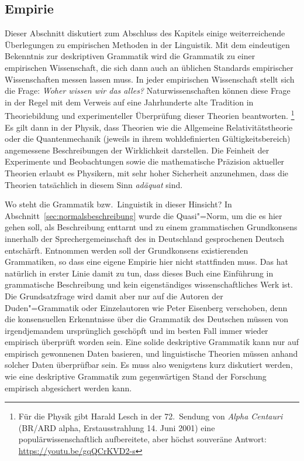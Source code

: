 \subsection{Empirie}

\label{sec:empirie}


Dieser Abschnitt diskutiert zum Abschluss des Kapitels einige weiterreichende Überlegungen zu empirischen Methoden in der Linguistik.
Mit dem eindeutigen Bekenntnis zur deskriptiven Grammatik wird die Grammatik zu einer empirischen Wissenschaft, die sich dann auch an üblichen Standards empirischer Wissenschaften messen lassen muss.     
In jeder empirischen Wissenschaft stellt sich die Frage:
\textit{Woher wissen wir das alles?}
Naturwissenschaften können diese Frage in der Regel mit dem Verweis auf eine Jahrhunderte alte Tradition in Theoriebildung und experimenteller Überprüfung dieser Theorien beantworten.%
\footnote{Für die Physik gibt Harald Lesch in der 72.\ Sendung von \textit{Alpha Centauri} (BR\slash ARD alpha, Erstausstrahlung 14. Juni 2001) eine populärwissenschaftlich aufbereitete, aber höchst souveräne Antwort: \url{https://youtu.be/gqQCrKVD2-s}}
Es gilt dann \zB in der Physik, dass Theorien wie die Allgemeine Relativitätstheorie oder die Quantenmechanik (jeweils in ihrem wohldefinierten Gültigkeitsbereich) angemessene Beschreibungen der Wirklichkeit darstellen.
Die Feinheit der Experimente und Beobachtungen sowie die mathematische Präzision aktueller Theorien erlaubt es Physikern, mit sehr hoher Sicherheit anzunehmen, dass die Theorien tatsächlich in diesem Sinn \textit{adäquat} sind.

Wo steht die Grammatik bzw.\ Linguistik in dieser Hinsicht?
In Abschnitt~\ref{sec:normalsbeschreibung} wurde die Quasi"=Norm, um die es hier gehen soll, als Beschreibung enttarnt und zu einem grammatischen Grundkonsens innerhalb der Sprechergemeinschaft des in Deutschland gesprochenen Deutsch entschärft.
Entnommen werden soll der Grundkonsens existierenden Grammatiken, so dass eine eigene Empirie hier nicht stattfinden muss.
Das hat natürlich in erster Linie damit zu tun, dass dieses Buch eine Einführung in grammatische Beschreibung und kein eigenständiges wissenschaftliches Werk ist.
Die Grundsatzfrage wird damit aber nur auf die Autoren der Duden"=Grammatik oder Einzelautoren wie Peter Eisenberg verschoben, denn die konsensuellen Erkenntnisse über die Grammatik des Deutschen müssen von irgendjemandem ursprünglich geschöpft und im besten Fall immer wieder empirisch überprüft worden sein.
Eine solide deskriptive Grammatik kann nur auf empirisch gewonnenen Daten basieren, und linguistische Theorien müssen anhand solcher Daten überprüfbar sein.
Es muss also wenigstens kurz diskutiert werden, wie eine deskriptive Grammatik zum gegenwärtigen Stand der Forschung empirisch abgesichert werden kann.

